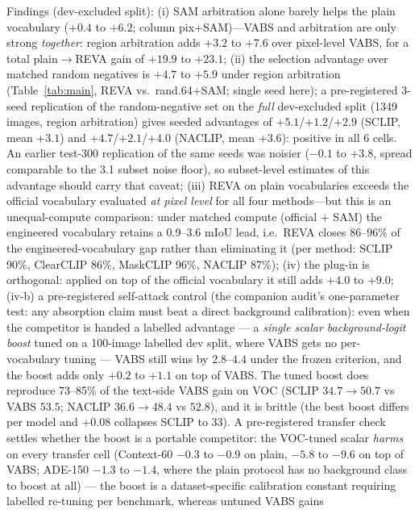 \documentclass[11pt]{article}
\newcommand{\miou}{mIoU}
\newcommand{\reva}{REVA}
\begin{document}
Findings (dev-excluded split): (i) SAM arbitration alone barely helps the plain
vocabulary ($+0.4$ to $+6.2$; column pix+SAM)---VABS and arbitration are only strong
\emph{together}: region arbitration adds $+3.2$ to $+7.6$ over pixel-level VABS, for
a total plain$\rightarrow$\reva{} gain of $+19.9$ to $+23.1$; (ii) the selection
advantage over matched random negatives is $+4.7$ to $+5.9$ under region
arbitration (Table~\ref{tab:main}, \reva{} vs.\ rand.64$+$SAM; single seed
here); a pre-registered 3-seed replication of the
random-negative set on the \emph{full} dev-excluded split (1349 images, region
arbitration) gives seeded advantages of $+5.1$/$+1.2$/$+2.9$ (SCLIP, mean
$+3.1$) and $+4.7$/$+2.1$/$+4.0$ (NACLIP, mean $+3.6$): positive in all 6
cells. An earlier test-300 replication of the same seeds was noisier
($-0.1$ to $+3.8$, spread comparable to the 3.1 subset noise floor), so
subset-level estimates of this advantage should carry that caveat;
(iii) \reva{} on plain vocabularies exceeds the official vocabulary evaluated
\emph{at pixel level} for all four methods---but this is an unequal-compute
comparison: under matched compute (official + SAM) the engineered vocabulary retains
a 0.9--3.6 \miou{} lead, i.e.\ \reva{} closes 86--96\% of the engineered-vocabulary
gap rather than eliminating it (per method: SCLIP 90\%, ClearCLIP 86\%, MaskCLIP
96\%, NACLIP 87\%); (iv) the plug-in is orthogonal: applied on top of the official
vocabulary it still adds $+4.0$ to $+9.0$; (iv-b) a pre-registered
self-attack control (the companion audit's one-parameter test: any
absorption claim must beat a direct background calibration): even when
the competitor is handed a labelled advantage --- a \emph{single scalar
background-logit boost} tuned on a 100-image labelled dev split, where
VABS gets no per-vocabulary tuning --- VABS still wins by $2.8$--$4.4$
under the frozen criterion, and the boost adds only $+0.2$ to $+1.1$
on top of VABS. The tuned boost does reproduce 73--85\% of the
text-side VABS gain on VOC (SCLIP $34.7\to50.7$ vs VABS $53.5$; NACLIP
$36.6\to48.4$ vs $52.8$), and it is brittle (the best boost differs per
model and $+0.08$ collapses SCLIP to $33$). A pre-registered transfer
check settles whether the boost is a portable competitor: the
VOC-tuned scalar \emph{harms} on every transfer cell (Context-60
$-0.3$ to $-0.9$ on plain, $-5.8$ to $-9.6$ on top of VABS; ADE-150
$-1.3$ to $-1.4$, where the plain protocol has no background class to
boost at all) --- the boost is a dataset-specific calibration constant
requiring labelled re-tuning per benchmark, whereas untuned VABS gains
\end{document}
